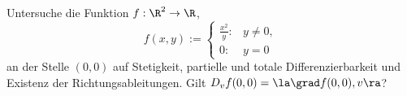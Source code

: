 \begin{prob}
Untersuche die Funktion $f:\R^2\to\R$,
$$
   f(x,y) := \begin{cases}\frac{x^2}{y}: & y\neq 0, \\ 0: & y=0
   \end{cases}
$$
an der Stelle $(0,0)$ auf Stetigkeit, partielle und totale
Differenzierbarkeit und Existenz der Richtungsableitungen. Gilt
$D_vf(0,0)=\la\grad f(0,0),v\ra$?
\end{prob}
